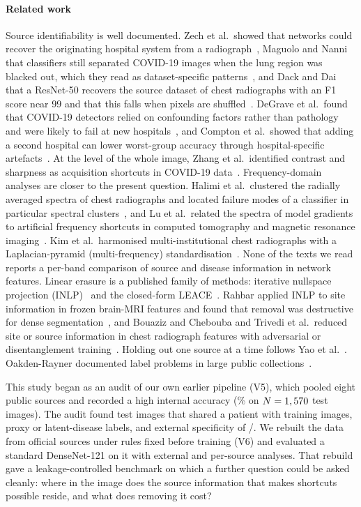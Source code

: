 \paragraph{Related work} Source identifiability is well documented. Zech et al.\ showed that networks could recover the originating hospital system from a radiograph~\cite{zech2018variable}, Maguolo and Nanni that classifiers still separated COVID-19 images when the lung region was blacked out, which they read as dataset-specific patterns~\cite{maguolo2020critic}, and Dack and Dai that a ResNet-50 recovers the source dataset of chest radiographs with an F1 score near 99 and that this falls when pixels are shuffled~\cite{dack2025bias}. DeGrave et al.\ found that COVID-19 detectors relied on confounding factors rather than pathology and were likely to fail at new hospitals~\cite{degrave2021ai}, and Compton et al.\ showed that adding a second hospital can lower worst-group accuracy through hospital-specific artefacts~\cite{compton2023more}. At the level of the whole image, Zhang et al.\ identified contrast and sharpness as acquisition shortcuts in COVID-19 data~\cite{zhang2023certified}. Frequency-domain analyses are closer to the present question. Halimi et al.\ clustered the radially averaged spectra of chest radiographs and located failure modes of a classifier in particular spectral clusters~\cite{halimi2026spectral}, and Lu et al.\ related the spectra of model gradients to artificial frequency shortcuts in computed tomography and magnetic resonance imaging~\cite{lu2025spectral}. Kim et al.\ harmonised multi-institutional chest radiographs with a Laplacian-pyramid (multi-frequency) standardisation~\cite{kim2023homogenization}. None of the texts we read reports a per-band comparison of source and disease information in network features. Linear erasure is a published family of methods: iterative nullspace projection (INLP)~\cite{ravfogel2020null} and the closed-form LEACE~\cite{belrose2023leace}. Rahbar applied INLP to site information in frozen brain-MRI features and found that removal was destructive for dense segmentation~\cite{rahbar2026site}, and Bouaziz and Chebouba and Trivedi et al.\ reduced site or source information in chest radiograph features with adversarial or disentanglement training~\cite{bouaziz2026site,robinson2022shortcut}. Holding out one source at a time follows Yao et al.~\cite{yao2019strong}. Oakden-Rayner documented label problems in large public collections~\cite{oakdenrayner2020exploring}.

This study began as an audit of our own earlier pipeline (V5), which pooled eight public sources and recorded a high internal accuracy (\RVFiveAcc\% on $N=1,570$ test images). The audit found test images that shared a patient with training images, proxy or latent-disease labels, and external specificity of \RVFiveExtSpecK/\RVFiveExtSpecN. We rebuilt the data from official sources under rules fixed before training (V6) and evaluated a standard DenseNet-121 on it with external and per-source analyses. That rebuild gave a leakage-controlled benchmark on which a further question could be asked cleanly: where in the image does the source information that makes shortcuts possible reside, and what does removing it cost?

